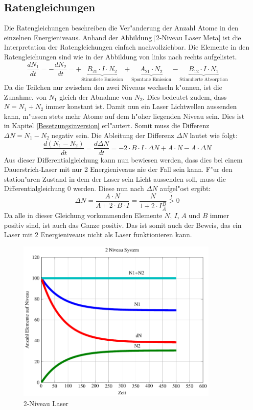 \begin{refsection}
\subsection{Ratengleichungen}
\label{2-Niveau Ratengleichungen}
Die Ratengleichungen beschreiben die Ver"anderung der Anzahl Atome in den
einzelnen Energieniveaus.
Anhand der Abbildung \ref{2-Niveau Laser Meta} ist die Interpretation der
Ratengleichungen einfach nachvollziehbar.
Die Elemente in den Ratengleichungen sind wie in der Abbildung von links
nach rechts aufgelistet.
\[
\frac{dN_1}{dt} = -\frac{dN_2}{dt} = 
+\underbrace{B_{21} \cdot  I \cdot N_2}_{\text{Stimuliete~Emission}}
+\underbrace{A_{21}\cdot N_2}_{\text{Spontane~Emission}}
-\underbrace{B_{12} \cdot I \cdot N_1}_{\text{Stimulierte~Absorption}}
\]
%
Da die Teilchen nur zwischen den zwei Niveaus wechseln k"onnen, ist die
Zunahme.
von $N_1$ gleich der Abnahme von $N_2$. 
Dies bedeutet zudem, dass $N = N_1 + N_2 $ immer konstant ist.
Damit nun ein Laser Lichtwellen aussenden kann, m"ussen stets mehr Atome auf
dem h"oher liegenden Niveau sein.
Dies ist in Kapitel \ref{Besetzungsinversion} erl"autert.
Somit muss die Differenz $\Delta N = N_1 - N_2$ negativ sein.
Die Ableitung der Differenz $\Delta N$ lautet wie folgt:
\[ \frac{d(N_1 - N_2)}{dt} = \frac{d \Delta N}{dt} = -2\cdot B\cdot I\cdot
\Delta N + A\cdot N - A\cdot \Delta N \]
Aus dieser Differentialgleichung kann nun bewiesen werden, dass dies bei einem
Dauerstrich-Laser mit nur 2 Energieniveaus nie der Fall sein kann. 
F"ur den station"aren Zustand in dem der Laser sein Licht aussenden soll, muss
die Differentialgleichung 0 werden.
Diese nun nach $\Delta N$ aufgel"ost ergibt:
\[ \Delta N = \frac{A\cdot N}{A+2\cdot B\cdot I} = \frac{N}{1+2\cdot I 
\frac{B}{A}} \stackrel{!}{>} 0\]
Da alle in dieser Gleichung vorkommenden Elemente $N$, $I$, $A$ und $B$ immer
positiv sind, ist auch das Ganze positiv.
Das ist somit auch der Beweis, das ein Laser mit 2 Energieniveaus nicht als
Laser funktionieren kann.
\begin{figure}
\centering
\includegraphics[width = 10cm]{laser/bilder/2_niveau.pdf}
\caption{2-Niveau Laser}
\label{2-Niveau Laser}
\end{figure}


\end{refsection}
